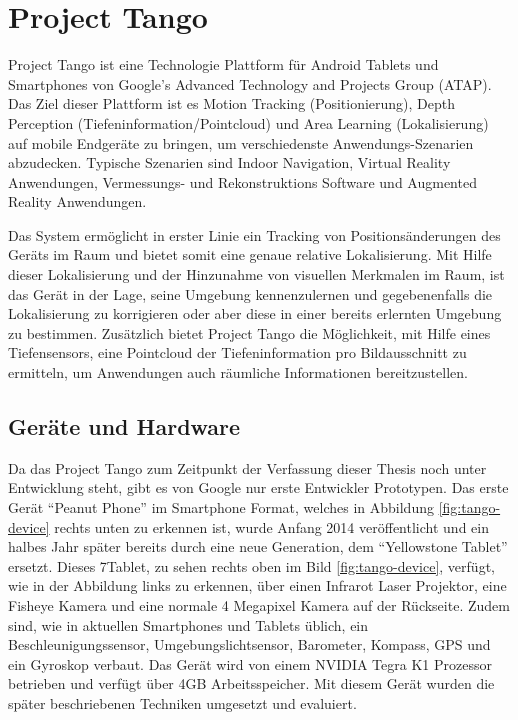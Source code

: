 
\section{Project Tango} \label{sec:theory_project_tango}

Project Tango ist eine Technologie Plattform für Android Tablets und Smartphones von Google’s Advanced Technology and Projects Group (ATAP). Das Ziel dieser Plattform ist es Motion Tracking (Positionierung), Depth Perception (Tiefeninformation/Pointcloud) und Area Learning (Lokalisierung) auf mobile Endgeräte zu bringen, um verschiedenste Anwendungs-Szenarien abzudecken. Typische Szenarien sind Indoor Navigation, Virtual Reality Anwendungen, Vermessungs- und Rekonstruktions Software und Augmented Reality Anwendungen.

Das System ermöglicht in erster Linie ein Tracking von Positionsänderungen des Geräts im Raum und bietet somit eine genaue relative Lokalisierung. Mit Hilfe dieser Lokalisierung und der Hinzunahme von visuellen Merkmalen im Raum, ist das Gerät in der Lage, seine Umgebung kennenzulernen und gegebenenfalls die Lokalisierung zu korrigieren oder aber diese in einer bereits erlernten Umgebung zu bestimmen. Zusätzlich bietet Project Tango die Möglichkeit, mit Hilfe eines Tiefensensors, eine Pointcloud der Tiefeninformation pro Bildausschnitt zu ermitteln, um Anwendungen auch räumliche Informationen bereitzustellen.  \citep{Proje19:online} 

\subsection{Geräte und Hardware}

Da das Project Tango zum Zeitpunkt der Verfassung dieser Thesis noch unter Entwicklung steht, gibt es von Google nur erste Entwickler Prototypen. Das erste Gerät \enquote{Peanut Phone} im Smartphone Format, welches in Abbildung \ref{fig:tango-device} rechts unten zu erkennen ist, wurde Anfang 2014 veröffentlicht und ein halbes Jahr später bereits durch eine neue Generation, dem \enquote{Yellowstone Tablet} ersetzt. Dieses 7\dq Tablet, zu sehen rechts oben im Bild \ref{fig:tango-device}, verfügt, wie in der Abbildung links zu erkennen, über einen Infrarot Laser Projektor, eine Fisheye Kamera und eine normale 4 Megapixel Kamera auf der Rückseite. Zudem sind, wie in aktuellen Smartphones und Tablets üblich, ein Beschleunigungssensor, Umgebungslichtsensor, Barometer, Kompass, GPS und ein Gyroskop verbaut. Das Gerät wird von einem NVIDIA Tegra K1 Prozessor betrieben und verfügt über 4GB Arbeitsspeicher. \citep{Proje19:online} Mit diesem Gerät wurden die später beschriebenen Techniken umgesetzt und evaluiert. 

